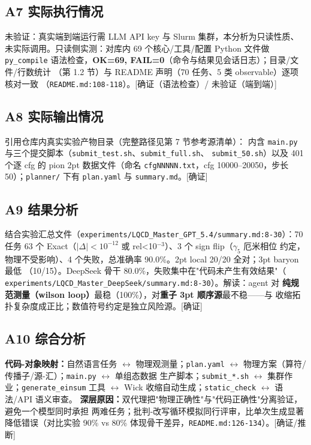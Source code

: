 \documentclass[UTF8]{ctexart}
\begin{document}
\subsection{A7 实际执行情况}

\textcolor{warn}{未验证}：真实端到端运行需 LLM API key 与 Slurm 集群，本分析为只读性质、
未实际调用。只读侧实测：对库内 69 个核心/工具/配置 Python 文件做 \texttt{py\_compile}
语法检查，\textbf{OK=69, FAIL=0}（命令与结果见会话日志）；目录/文件/行数统计
（第 1.2 节）与 README 声明（70 任务、5 类 observable）逐项核对一致
（\texttt{\nolinkurl{README.md:108-118}}）。[确证（语法检查）/ 未验证（端到端）]

\subsection{A8 实际输出情况}

引用仓库内真实实验产物目录（完整路径见第 7 节参考源清单）：
内含 \texttt{main.py} 与三个提交脚本（\texttt{submit\_test.sh}、\texttt{submit\_full.sh}、
\texttt{submit\_50.sh}）以及 401 个逐 cfg 的 pion 2pt 数据文件（命名
\texttt{cfgNNNNN.txt}，cfg 10000--20050，步长 50）；\texttt{planner/} 下有
\texttt{plan.yaml} 与 \texttt{summary.md}。[确证]

\subsection{A9 结果分析}

结合实验汇总文件（\texttt{experiments/LQCD\_Master\_GPT\_5.4/summary.md:8-30}）：70 任务
63 个 Exact（$\lvert\Delta\rvert<10^{-12}$ 或 rel<10$^{-3}$）、3 个 sign flip（$\gamma_5$ 厄米相位
约定，物理不受影响）、4 个失败，总准确率 90.0\%。2pt local 20/20 全对；3pt baryon 最低
（10/15）。DeepSeek 骨干 80.0\%，失败集中在"代码未产生有效结果"（
\texttt{\nolinkurl{experiments/LQCD_Master_DeepSeek/summary.md:8-30}}）。解读：agent 对
\textbf{纯规范测量（wilson loop）}最稳（100\%），对\textbf{重子 3pt 顺序源}最不稳——与
收缩拓扑复杂度成正比；数值符号约定是独立风险源。[确证]

\subsection{A10 综合分析}

\textbf{代码-对象映射：}自然语言任务 $\leftrightarrow$ 物理观测量；\texttt{plan.yaml}
$\leftrightarrow$ 物理方案（算符/传播子/源-汇）；\texttt{main.py} $\leftrightarrow$ 单组态数据
生产脚本；\texttt{submit\_*.sh} $\leftrightarrow$ 集群作业；\texttt{generate\_einsum} 工具
$\leftrightarrow$ Wick 收缩自动生成；\texttt{static\_check} $\leftrightarrow$ 语法/API 语义审查。
\textbf{深层原因：}双代理把"物理正确性"与"代码正确性"分离验证，避免一个模型同时承担
两难任务；批判-改写循环模拟同行评审，比单次生成显著降低错误（对比实验 90\% vs 80\%
体现骨干差异，\texttt{\nolinkurl{README.md:126-134}}）。[确证/推断]
\end{document}
